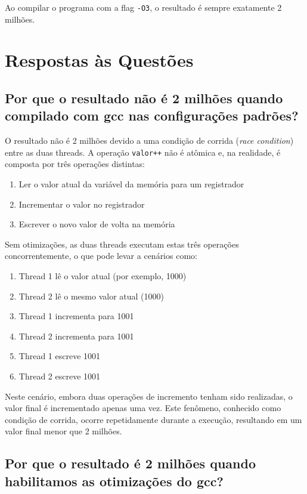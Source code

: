 \documentclass[12pt]{article}
\begin{document}
Ao compilar o programa com a flag \texttt{-O3}, o resultado é sempre exatamente 2 milhões.

\section{Respostas às Questões}

\subsection{Por que o resultado não é 2 milhões quando compilado com gcc nas configurações padrões?}

O resultado não é 2 milhões devido a uma condição de corrida (\textit{race condition}) entre as duas threads. A operação \texttt{valor++} não é atômica e, na realidade, é composta por três operações distintas:

\begin{enumerate}
    \item Ler o valor atual da variável da memória para um registrador
    \item Incrementar o valor no registrador
    \item Escrever o novo valor de volta na memória
\end{enumerate}

Sem otimizações, as duas threads executam estas três operações concorrentemente, o que pode levar a cenários como:

\begin{enumerate}
    \item Thread 1 lê o valor atual (por exemplo, 1000)
    \item Thread 2 lê o mesmo valor atual (1000)
    \item Thread 1 incrementa para 1001
    \item Thread 2 incrementa para 1001
    \item Thread 1 escreve 1001
    \item Thread 2 escreve 1001
\end{enumerate}

Neste cenário, embora duas operações de incremento tenham sido realizadas, o valor final é incrementado apenas uma vez. Este fenômeno, conhecido como condição de corrida, ocorre repetidamente durante a execução, resultando em um valor final menor que 2 milhões.

\subsection{Por que o resultado é 2 milhões quando habilitamos as otimizações do gcc?}
\end{document}
